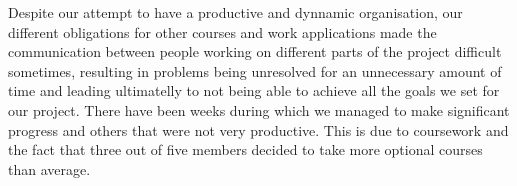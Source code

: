 \documentclass[10pt, a4paper]{report}
\begin{document}
Despite our attempt to have a productive and dynnamic organisation, our different obligations for other courses and work applications made the communication between people working on different parts of the project difficult sometimes, resulting in problems being unresolved for an unnecessary amount of time and leading ultimatelly to not being able to achieve all the goals we set for our project. 
There have been weeks during which we managed to make significant progress and others that were not very productive. This is due to coursework and the fact that three out of five members decided to take more optional courses than average. 





\end{document}
